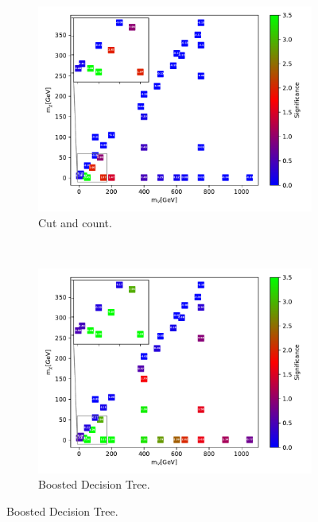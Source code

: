 \begin{figure}[H]
    \centering
    \begin{subfigure}[t!]{0.49\textwidth}
    \includegraphics[width = \textwidth]{Figures/Significances/significanceCutandCount_monoZ_all.pdf}
    \caption{Cut and count.}
        \label{fig:signHighmonoZcandc}
    \end{subfigure}
    \\
    \begin{subfigure}[t!]{0.49\textwidth}
    \includegraphics[width = \textwidth]{Figures/Significances/significance_BDT_monoZ_High_level.pdf}
    \caption{Boosted Decision Tree.}
        \label{fig:signHighmonoZBDT}
    \end{subfigure}      

\end{figure}
